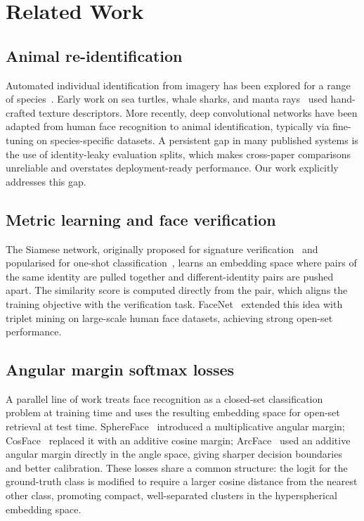 \section{Related Work}
\label{sec:related}

\subsection{Animal re-identification}

Automated individual identification from imagery has been explored for a range of
species~\cite{schneider2022reidentification}.
Early work on sea turtles, whale sharks, and manta rays~\cite{ravela2004visual,
moskvyak2021robust} used hand-crafted texture descriptors.  More recently, deep
convolutional networks have been adapted from human face recognition to animal identification,
typically via fine-tuning on species-specific datasets.  A persistent gap in many published
systems is the use of identity-leaky evaluation splits, which makes cross-paper comparisons
unreliable and overstates deployment-ready performance.  Our work explicitly addresses
this gap.

\subsection{Metric learning and face verification}

The Siamese network, originally proposed for signature verification~\cite{bromley1994signature}
and popularised for one-shot classification~\cite{koch2015siamese}, learns an embedding
space where pairs of the same identity are pulled together and different-identity pairs
are pushed apart.  The similarity score is computed directly from the pair, which aligns
the training objective with the verification task.
FaceNet~\cite{schroff2015facenet} extended this idea with triplet mining on large-scale
human face datasets, achieving strong open-set performance.

\subsection{Angular margin softmax losses}

A parallel line of work treats face recognition as a closed-set classification problem
at training time and uses the resulting embedding space for open-set retrieval at test time.
SphereFace~\cite{liu2017sphereface} introduced a multiplicative angular margin;
CosFace~\cite{wang2018cosface} replaced it with an additive cosine margin;
ArcFace~\cite{deng2019arcface} used an additive angular margin directly in the angle space,
giving sharper decision boundaries and better calibration.
These losses share a common structure: the logit for the ground-truth class is modified
to require a larger cosine distance from the nearest other class, promoting compact,
well-separated clusters in the hyperspherical embedding space.

